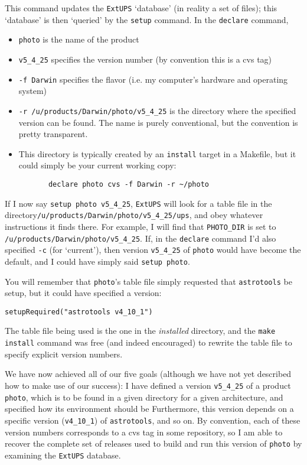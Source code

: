 \documentclass{article}
\newcommand{\code}[1]{\texttt{#1}}
\newcommand{\eups}{\code{ExtUPS}}
\begin{document}
This command updates the \eups{} `database' (in reality a set of files);
this `database' is then `queried' by the \code{setup} command. In
the \code{declare} command,
\begin{itemize}
  \item
    \code{photo} is the name of the product

  \item
    \code{v5\_4\_25} specifies the version number (by convention this
    is a cvs tag)

  \item
    \code{-f Darwin} specifies the flavor (i.e. my computer's hardware and
    operating system)

  \item
    \code{-r /u/products/Darwin/photo/v5\_4\_25} is the directory where
    the specified version can be found. The name is purely conventional,
    but the convention is pretty transparent.

  \item
    This directory is typically created by an \code{install} target
    in a Makefile, but it could simply be your current working
    copy:
\begin{verbatim}
       declare photo cvs -f Darwin -r ~/photo
\end{verbatim}
\end{itemize}

If I now say \code{setup photo v5\_4\_25}, \eups{} will look for
a table file in the directory\hfil\break \code{/u/products/Darwin/photo/v5\_4\_25/ups},
and obey whatever instructions it finds there.  For example,
I will find that
\code{PHOTO\_DIR} is set to \code{/u/products/Darwin/photo/v5\_4\_25}. If,
in the \code{declare} command I'd also specified \code{-c} (for
`current'), then version \code{v5\_4\_25} of \code{photo} would
have become the default, and I could have simply said \code{setup photo}.

You will remember that \code{photo}'s table file simply requested
that \code{astrotools} be setup, but it could have specified a version:
\begin{verbatim}
setupRequired("astrotools v4_10_1")
\end{verbatim}
The table file being used is the one in the \emph{installed} directory,
and the \code{make install} command was free (and indeed encouraged) to
rewrite the table file to specify explicit version numbers.

We have now achieved all of our five goals (although we have not
yet described how to make use of our success): I have defined
a version \code{v5\_4\_25} of a product \code{photo}, which is
to be found in a given directory for a given architecture,
and specified how its environment should be Furthermore,
this version depends on a specific version (\code{v4\_10\_1}) of
\code{astrotools}, and so on. By convention, each of these version
numbers corresponds to a cvs tag in some repository, so I am
able to recover the complete set of releases used to build and
run this version of \code{photo} by examining the \eups{} database.
\end{document}
